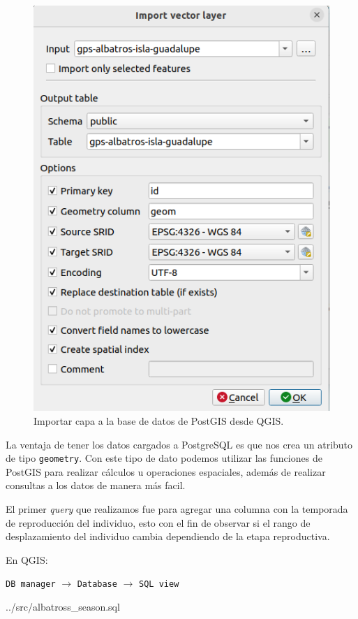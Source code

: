 \begin{figure}[h]
    \centering
    \includegraphics[scale=0.40]{figures/importLayerVector.png}
    \caption{Importar capa a la base de datos de PostGIS desde QGIS.}
    \label{fig:importLayer}
\end{figure}

La ventaja de tener los datos cargados a PostgreSQL es que nos crea un atributo
de tipo \texttt{geometry}. Con este tipo de dato podemos utilizar las funciones
de PostGIS para realizar cálculos u operaciones espaciales, además de realizar
consultas a los datos de manera más facil.

El primer \textit{query} que realizamos fue para agregar una columna con la
temporada de reproducción del individuo, esto con el fin de observar si el rango
de desplazamiento del individuo cambia dependiendo de la etapa reproductiva.

En QGIS:

\texttt{DB manager} $\rightarrow$ \texttt{Database} $\rightarrow$ \texttt{SQL
view} 

 {../src/albatross_season.sql}

